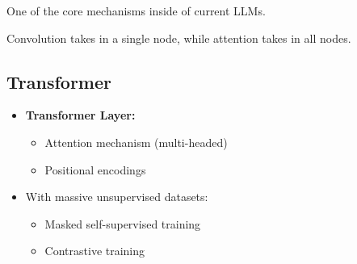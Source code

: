 \begin{motivation}
    One of the core mechanisms inside of current LLMs. 
\end{motivation}

\begin{warning}
    Convolution takes in a single node, while attention takes in all nodes. 
\end{warning}

\subsection{Transformer}
\begin{notes}
    \begin{itemize}
        \item \textbf{Transformer Layer:} 
        \begin{itemize}
            \item Attention mechanism (multi-headed)
            \item Positional encodings
        \end{itemize}
        \item With massive unsupervised datasets: 
        \begin{itemize}
            \item Masked self-supervised training
            \item Contrastive training
        \end{itemize}
    \end{itemize}
\end{notes}
\newpage

